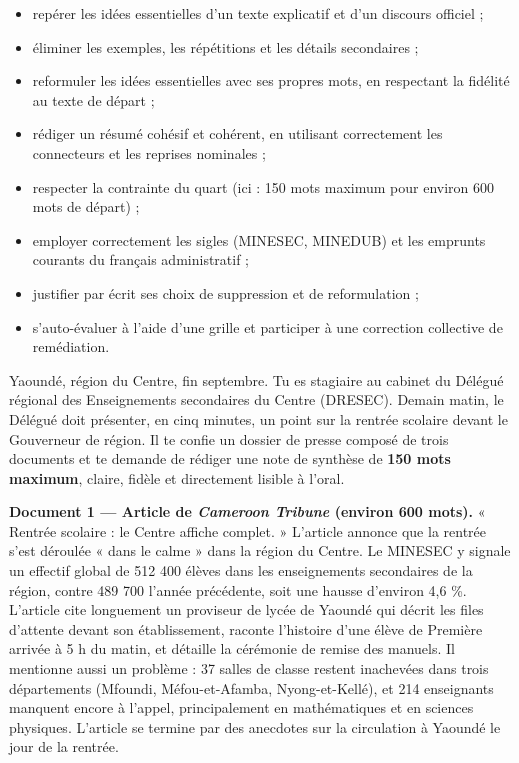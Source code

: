 \documentclass[11pt]{article}
\newcommand{\cle}[1]{{\popxbold\color{popdark}#1}}
\newcounter{popsec}
\newcounter{popsub}
\newcommand{\courssub}[1]{%
  \stepcounter{popsub}%
  \par\vspace{9pt}\noindent{\popxbold\fontsize{11.5}{13}\selectfont\color{popink}{\color{poporange}\thepopsec.\thepopsub}\hspace{6pt}#1}\par\nopagebreak\vspace{4pt}
}
\begin{document}
\begin{itemize}
\item repérer les \cle{idées essentielles} d'un texte explicatif et d'un discours officiel ;
\item éliminer les exemples, les répétitions et les détails secondaires ;
\item reformuler les idées essentielles avec ses propres mots, en respectant la \cle{fidélité} au texte de départ ;
\item rédiger un résumé \cle{cohésif} et \cle{cohérent}, en utilisant correctement les connecteurs et les reprises nominales ;
\item respecter la \cle{contrainte du quart} (ici : 150 mots maximum pour environ 600 mots de départ) ;
\item employer correctement les \cle{sigles} (MINESEC, MINEDUB) et les \cle{emprunts} courants du français administratif ;
\item justifier par écrit ses choix de suppression et de reformulation ;
\item s'auto-évaluer à l'aide d'une grille et participer à une correction collective de remédiation.
\end{itemize}

\courssub{Situation}

Yaoundé, région du Centre, fin septembre. Tu es stagiaire au cabinet du Délégué régional des Enseignements secondaires du Centre (DRESEC). Demain matin, le Délégué doit présenter, en cinq minutes, un point sur la rentrée scolaire devant le Gouverneur de région. Il te confie un dossier de presse composé de trois documents et te demande de rédiger une \cle{note de synthèse} de \textbf{150 mots maximum}, claire, fidèle et directement lisible à l'oral.

\textbf{Document 1 — Article de \emph{Cameroon Tribune} (environ 600 mots).} « Rentrée scolaire : le Centre affiche complet. » L'article annonce que la rentrée s'est déroulée « dans le calme » dans la région du Centre. Le MINESEC y signale un effectif global de 512 400 élèves dans les enseignements secondaires de la région, contre 489 700 l'année précédente, soit une hausse d'environ 4,6 \%. L'article cite longuement un proviseur de lycée de Yaoundé qui décrit les files d'attente devant son établissement, raconte l'histoire d'une élève de Première arrivée à 5 h du matin, et détaille la cérémonie de remise des manuels. Il mentionne aussi un problème : 37 salles de classe restent inachevées dans trois départements (Mfoundi, Méfou-et-Afamba, Nyong-et-Kellé), et 214 enseignants manquent encore à l'appel, principalement en mathématiques et en sciences physiques. L'article se termine par des anecdotes sur la circulation à Yaoundé le jour de la rentrée.
\end{document}
